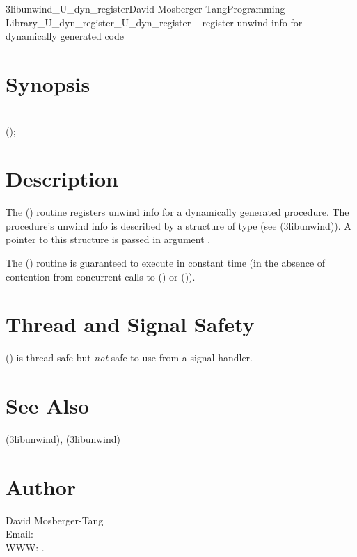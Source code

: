 \documentclass{article}
\begin{document}
\begin{Name}{3libunwind}{\_U\_dyn\_register}{David Mosberger-Tang}{Programming Library}{\_U\_dyn\_register}\_U\_dyn\_register -- register unwind info for dynamically generated code
\end{Name}

\section{Synopsis}

\\

 ();\\

\section{Description}

The () routine registers unwind info for a
dynamically generated procedure.  The procedure's unwind info is
described by a structure of type  (see
(3libunwind)).  A pointer to this structure is
passed in argument .

The () routine is guaranteed to execute in
constant time (in the absence of contention from concurrent calls to
() or ()).


\section{Thread and Signal Safety}

() is thread safe but \emph{not} safe to use
from a signal handler.

\section{See Also}

(3libunwind),
(3libunwind)

\section{Author}

\noindent
David Mosberger-Tang\\
Email: \\
WWW: .
\LatexManEnd
\end{document}
